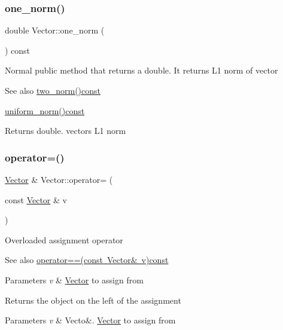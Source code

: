 \subsubsection{\texorpdfstring{one\+\_\+norm()}{one\_norm()}}
{\footnotesize\ttfamily double Vector\+::one\+\_\+norm (\begin{DoxyParamCaption}{ }\end{DoxyParamCaption}) const}

Normal public method that returns a double. It returns L1 norm of vector \begin{DoxySeeAlso}{See also}
\mbox{\hyperlink{class_vector_a4f501290a50d057bb6c57ea64d7e70a4}{two\+\_\+norm()const}} 

\mbox{\hyperlink{class_vector_a50b72131eaf3698a9876d99ab6912a32}{uniform\+\_\+norm()const}} 
\end{DoxySeeAlso}
\begin{DoxyReturn}{Returns}
double. vectors L1 norm 
\end{DoxyReturn}
\mbox{\label{class_vector_ae48c467a9f65d60e2f7455aba4ca1239}} 
\subsubsection{\texorpdfstring{operator=()}{operator=()}}
{\footnotesize\ttfamily \mbox{\hyperlink{class_vector}{Vector}} \& Vector\+::operator= (\begin{DoxyParamCaption}\item[{const \mbox{\hyperlink{class_vector}{Vector}} \&}]{v }\end{DoxyParamCaption})}

Overloaded assignment operator \begin{DoxySeeAlso}{See also}
\mbox{\hyperlink{class_vector_ade5fbd0cd01b034d1907e0c93433320c}{operator==(const Vector\& v)const}} 
\end{DoxySeeAlso}

\begin{DoxyParams}{Parameters}
{\em v} & \mbox{\hyperlink{class_vector}{Vector}} to assign from \\
\hline
\end{DoxyParams}
\begin{DoxyReturn}{Returns}
the object on the left of the assignment 
\end{DoxyReturn}

\begin{DoxyParams}{Parameters}
{\em v} & Vecto\&. \mbox{\hyperlink{class_vector}{Vector}} to assign from \\
\hline
\end{DoxyParams}
\mbox{\label{class_vector_ade5fbd0cd01b034d1907e0c93433320c}} 
